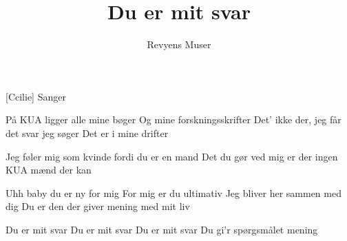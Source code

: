 \documentclass[a4paper,12pt]{article}
\title{Du er mit svar}
\author{Revyens Muser}
\begin{document}
\maketitle

\begin{roles}
  [Ccilie] Sanger
\end{roles}

\begin{song}

 På KUA ligger alle mine bøger
Og mine forskningsskrifter  
Det' ikke der, jeg får det svar jeg søger
Det er i mine drifter

Jeg føler mig som kvinde fordi du er en mand
Det du gør ved mig er der ingen KUA mænd der kan

Uhh baby du er ny for mig
For mig er du ultimativ
Jeg bliver her sammen med dig
Du er den der giver mening med mit liv

Du er mit svar
Du er mit svar
Du er mit svar
Du gi'r spørgsmålet mening


\end{song}
\end{document}
